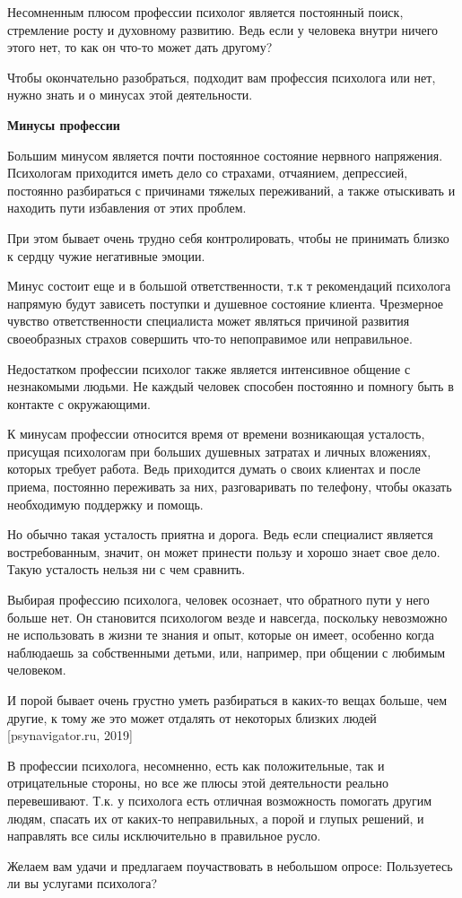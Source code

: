 Несомненным плюсом профессии психолог является постоянный поиск, стремление росту и духовному развитию. Ведь если у человека внутри ничего этого нет, то как он что-то может дать другому?

Чтобы окончательно разобраться, подходит вам профессия психолога или нет, нужно знать и о минусах этой деятельности.

\textbf{Минусы профессии}

Большим минусом является почти постоянное состояние нервного напряжения. Психологам приходится иметь дело со страхами, отчаянием, депрессией, постоянно разбираться с причинами тяжелых переживаний, а также отыскивать и находить пути избавления от этих проблем.

При этом бывает очень трудно себя контролировать, чтобы не принимать близко к сердцу чужие негативные эмоции.

Минус состоит еще и в большой ответственности, т.к т рекомендаций психолога напрямую будут зависеть поступки и душевное состояние клиента. Чрезмерное чувство ответственности специалиста может являться причиной развития своеобразных страхов совершить что-то непоправимое или неправильное.

Недостатком профессии психолог также является интенсивное общение с незнакомыми людьми. Не каждый человек способен постоянно и помногу быть в контакте с окружающими.

К минусам профессии относится время от времени возникающая усталость, присущая психологам при больших душевных затратах и личных вложениях, которых требует работа. Ведь приходится думать о своих клиентах и после приема, постоянно переживать за них, разговаривать по телефону, чтобы оказать необходимую поддержку и помощь.

Но обычно такая усталость приятна и дорога. Ведь если специалист является востребованным, значит, он может принести пользу и хорошо знает свое дело. Такую усталость нельзя ни с чем сравнить.

Выбирая профессию психолога, человек осознает, что обратного пути у него больше нет. Он становится психологом везде и навсегда, поскольку невозможно не использовать в жизни те знания и опыт, которые он имеет, особенно когда наблюдаешь за собственными детьми, или, например, при общении с любимым человеком.

И порой бывает очень грустно уметь разбираться в каких-то вещах больше, чем другие, к тому же это может отдалять от некоторых близких людей [psynavigator.ru, 2019]

В профессии психолога, несомненно, есть как положительные, так и отрицательные стороны, но все же плюсы этой деятельности реально перевешивают. Т.к. у психолога есть отличная возможность помогать другим людям, спасать их от каких-то неправильных, а порой и глупых решений, и направлять все силы исключительно в правильное русло.

Желаем вам удачи и предлагаем поучаствовать в небольшом опросе: Пользуетесь ли вы услугами психолога?